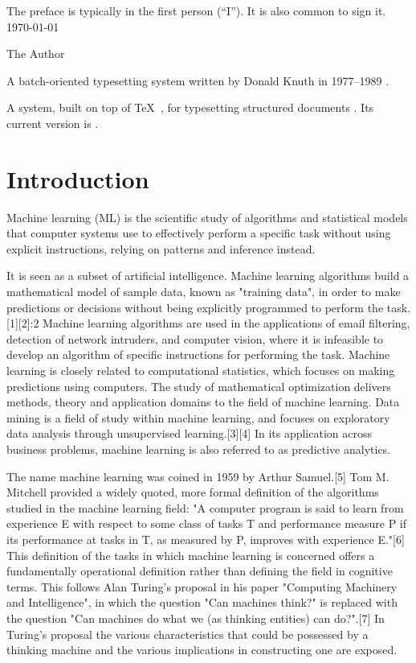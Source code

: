 \documentclass[utf8,bachelor,english]{gradu3}
\begin{document}
The preface is typically in the first person (``I'').  It is also common
to sign it.
 \today

\bigskip

The Author

\begin{thetermlist}
\item[\TeX] A batch-oriented typesetting system written by 
Donald Knuth in 1977--1989 \parencite[see][]{knuth86:_texbook}. 
\item[\LaTeX] A system, built on top of \TeX\
  \parencite{knuth86:_texbook}, for typesetting structured
  documents \parencite[see][]{lamport94:_latex}.  Its current version
  is \LaTeXe.
\end{thetermlist}
\mainmatter

\chapter{Introduction}

Machine learning (ML) is the scientific study of algorithms and statistical models that computer systems use to effectively perform a specific task without using explicit instructions, relying on patterns and inference instead. 

It is seen as a subset of artificial intelligence. Machine learning algorithms build a mathematical model of sample data, known as "training data", in order to make predictions or decisions without being explicitly programmed to perform the task.[1][2]:2 Machine learning algorithms are used in the applications of email filtering, detection of network intruders, and computer vision, where it is infeasible to develop an algorithm of specific instructions for performing the task. Machine learning is closely related to computational statistics, which focuses on making predictions using computers. The study of mathematical optimization delivers methods, theory and application domains to the field of machine learning. Data mining is a field of study within machine learning, and focuses on exploratory data analysis through unsupervised learning.[3][4] In its application across business problems, machine learning is also referred to as predictive analytics.

The name machine learning was coined in 1959 by Arthur Samuel.[5] Tom M. Mitchell provided a widely quoted, more formal definition of the algorithms studied in the machine learning field: "A computer program is said to learn from experience E with respect to some class of tasks T and performance measure P if its performance at tasks in T, as measured by P, improves with experience E."[6] This definition of the tasks in which machine learning is concerned offers a fundamentally operational definition rather than defining the field in cognitive terms. This follows Alan Turing's proposal in his paper "Computing Machinery and Intelligence", in which the question "Can machines think?" is replaced with the question "Can machines do what we (as thinking entities) can do?".[7] In Turing's proposal the various characteristics that could be possessed by a thinking machine and the various implications in constructing one are exposed.
\end{document}
